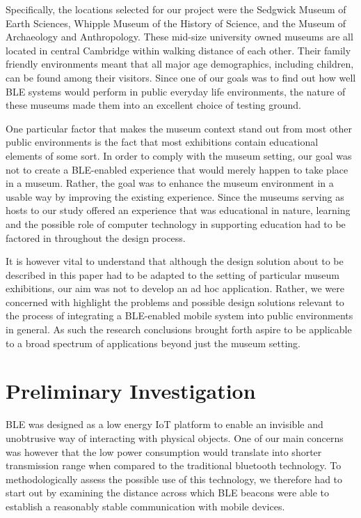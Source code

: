 \documentclass[prodmode,acmtomm]{acmsmall}
\begin{document}
Specifically, the locations selected for our project were the Sedgwick Museum of Earth Sciences, Whipple Museum of the History of Science, and the Museum of Archaeology and Anthropology. These mid-size university owned museums are all located in central Cambridge within walking distance of each other. Their family friendly environments meant that all major age demographics, including children, can be found among their visitors. Since one of our goals was to find out how well BLE systems would perform in public everyday life environments, the nature of these museums made them into an excellent choice of testing ground. 









One particular factor that makes the museum context stand out from most other public environments is the fact that most exhibitions contain educational elements of some sort. In order to comply with the museum setting, our goal was not to create a BLE-enabled experience that would merely happen to take place in a museum. Rather, the goal was to enhance the museum environment in a usable way by improving the existing experience. Since the museums serving as hosts to our study offered an experience that was educational in nature, learning and the possible role of computer technology in supporting education had to be factored in throughout the design process.

It is however vital to understand that although the design solution about to be described in this paper had to be adapted to the setting of particular museum exhibitions, our aim was not to develop an ad hoc application. Rather, we were concerned with highlight the problems and possible design solutions relevant to the process of integrating a BLE-enabled mobile system into public environments in general. As such the research conclusions brought forth aspire to be applicable to a broad spectrum of applications beyond just the museum setting. 



\section{Preliminary Investigation}
BLE was designed as a low energy IoT platform to enable an invisible and unobtrusive way of interacting with physical objects. One of our main concerns was however that the low power consumption would translate into shorter transmission range when compared to the traditional bluetooth technology. To methodologically assess the possible use of this technology, we therefore had to start out by examining the distance across which BLE beacons were able to establish a reasonably stable communication with mobile devices. 
\end{document}
